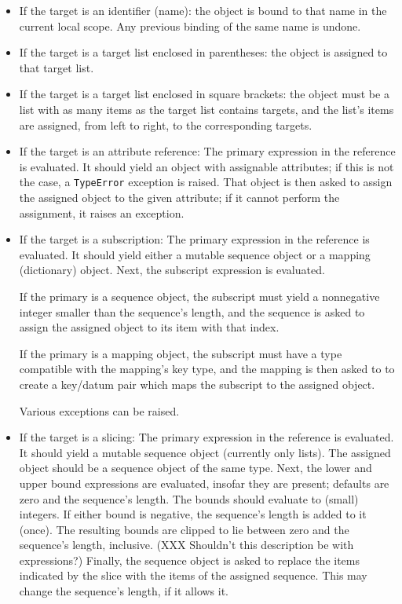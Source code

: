 \begin{itemize}

\item
If the target is an identifier (name):
the object is bound to that name
in the current local scope.  Any previous binding of the same name
is undone.

\item
If the target is a target list enclosed in parentheses:
the object is assigned to that target list.

\item
If the target is a target list enclosed in square brackets:
the object must be a list with as many items
as the target list contains targets,
and the list's items are assigned, from left to right,
to the corresponding targets.

\item
If the target is an attribute reference:
The primary expression in the reference is evaluated.
It should yield an object with assignable attributes;
if this is not the case, a {\tt TypeError} exception is raised.
That object is then asked to assign the assigned object
to the given attribute; if it cannot perform the assignment,
it raises an exception.

\item
If the target is a subscription:
The primary expression in the reference is evaluated.
It should yield either a mutable sequence object or a mapping
(dictionary) object.
Next, the subscript expression is evaluated.

If the primary is a sequence object, the subscript must yield a
nonnegative integer smaller than the sequence's length,
and the sequence is asked to assign the assigned object
to its item with that index.

If the primary is a mapping object, the subscript must have a
type compatible with the mapping's key type,
and the mapping is then asked to to create a key/datum pair
which maps the subscript to the assigned object.

Various exceptions can be raised.

\item
If the target is a slicing:
The primary expression in the reference is evaluated.
It should yield a mutable sequence object (currently only lists).
The assigned object should be a sequence object of the same type.
Next, the lower and upper bound expressions are evaluated,
insofar they are present; defaults are zero and the sequence's length.
The bounds should evaluate to (small) integers.
If either bound is negative, the sequence's length is added to it (once).
The resulting bounds are clipped to lie between zero
and the sequence's length, inclusive.
(XXX Shouldn't this description be with expressions?)
Finally, the sequence object is asked to replace the items
indicated by the slice with the items of the assigned sequence.
This may change the sequence's length, if it allows it.

\end{itemize}

